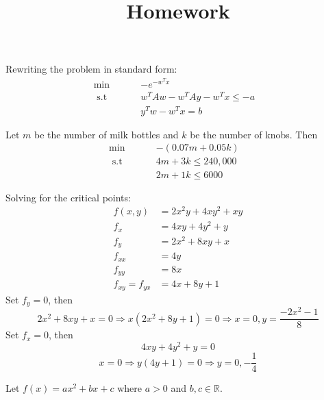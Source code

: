 \documentclass[12pt]{article}
\title{Homework}
\newcommand{\R}{\mathbb{R}}
\newenvironment{problem}[2][Problem]{\begin{trivlist}
\item[\hskip \labelsep {\bfseries #1}\hskip \labelsep {\bfseries #2}]}{\end{trivlist}}
\begin{document}
\begin{problem}{1.}
Rewriting the problem in standard form: 
\begin{align*}
\min \hspace{1cm} & - e^{-w^Tx} &\\
 \text{ s.t } \hspace{1cm}  & w^TAw -w^TAy - w^Tx \leq -a& \\
&y^Tw - w^Tx = b&
\end{align*}
\end{problem}

\begin{problem}{5.}
Let $m$ be the number of milk bottles and $k$ be the number of knobs. Then 
\begin{align*}
\min \hspace{1cm} & - (0.07m + 0.05k)&\\
 \text{ s.t } \hspace{1cm}  &4m +3k  \leq 240,000 & \\
& 2m +1 k\leq 6000 &
\end{align*}
\end{problem}


\begin{problem}{6.} 
Solving for the critical points: 
\begin{align*}
f(x,y)  &= 2x^2y + 4xy^2 + xy\\
f_x &= 4xy + 4y^2 + y \\
f_y &= 2x^2 + 8xy +x\\
f_{xx} & = 4y \\
f_{yy} & = 8x \\
f_{xy} = f_{yx} &= 4x + 8y + 1
\end{align*}
Set $f_y = 0$, then 
$$ 2x^2 + 8xy +x = 0 \Rightarrow x(2x^2 + 8y + 1) = 0 \Rightarrow x = 0, y = \frac{-2x^2 -1}{8} $$
Set $f_x = 0$, then 
$$4xy + 4y^2 + y  = 0 $$
$$x = 0 \Rightarrow y(4y + 1) = 0 \Rightarrow y = 0, -\frac{1}{4}$$
\end{problem}

\begin{problem}{11.} 
Let $f(x) = ax^2 + bx + c$ where $a > 0$ and $b,c \in \R$. 
\end{problem}

\begin{problem}{14.} 
\end{problem}
\end{document}
